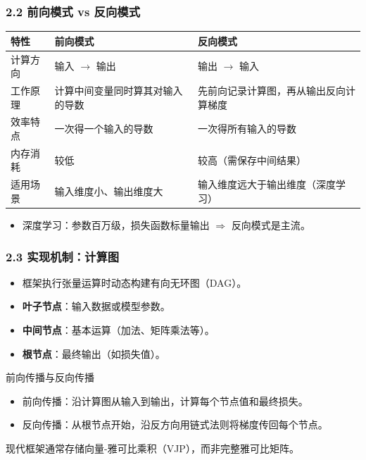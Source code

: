\documentclass[t,aspectratio=169]{beamer} %
\begin{document}
\begin{frame}
    \frametitle{2.2 前向模式 vs 反向模式}
    \begin{table}
        \centering
        \renewcommand{\arraystretch}{1.3}
        \footnotesize
        \begin{tabular}{|p{1.8cm}|p{4.5cm}|p{4.5cm}|}
            \hline
            \textbf{特性} & \textbf{前向模式} & \textbf{反向模式} \\
            \hline
            计算方向 & 输入 $\to$ 输出 & 输出 $\to$ 输入 \\
            \hline
            工作原理 & 计算中间变量同时算其对输入的导数 & 先前向记录计算图，再从输出反向计算梯度 \\
            \hline
            效率特点 & 一次得\alert{一个输入}的导数 & 一次得\alert{所有输入}的导数 \\
            \hline
            内存消耗 & 较低 & 较高（需保存中间结果） \\
            \hline
            适用场景 & 输入维度小、输出维度大 & \alert{输入维度远大于输出维度}（深度学习） \\
            \hline
        \end{tabular}
    \end{table}
    \begin{itemize}
        \item 深度学习：参数百万级，损失函数标量输出 $\Rightarrow$ \alert{反向模式是主流}。
    \end{itemize}
\end{frame}

\begin{frame}
    \frametitle{2.3 实现机制：计算图}
    \begin{itemize}
        \item 框架执行张量运算时\alert{动态构建有向无环图}（DAG）。
        \item \textbf{叶子节点}：输入数据或模型参数。
        \item \textbf{中间节点}：基本运算（加法、矩阵乘法等）。
        \item \textbf{根节点}：最终输出（如损失值）。
    \end{itemize}
    \begin{block}{前向传播与反向传播}
        \begin{itemize}
            \item \alert{前向传播}：沿计算图从输入到输出，计算每个节点值和最终损失。
            \item \alert{反向传播}：从根节点开始，沿反方向用链式法则将梯度传回每个节点。
        \end{itemize}
        现代框架通常存储\alert{向量-雅可比乘积}（VJP），而非完整雅可比矩阵。
    \end{block}
\end{frame}
\end{document}
